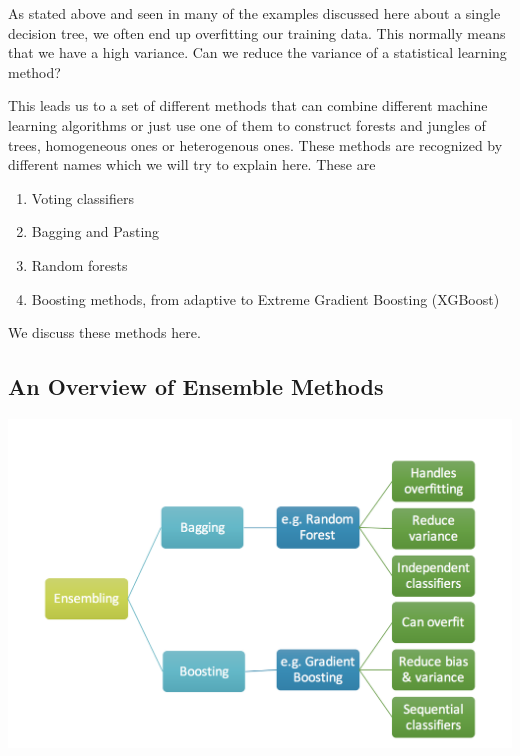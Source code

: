 \documentclass[%
oneside,                 %
final,                   %
10pt]{article}
\begin{document}
As stated above and seen in many of the examples discussed here about
a single decision tree, we often end up overfitting our training
data. This normally means that we have a high variance. Can we reduce
the variance of a statistical learning method?

This leads us to a set of different methods that can combine different
machine learning algorithms or just use one of them to construct forests and jungles of trees, homogeneous ones or heterogenous ones. These methods are recognized by different names which we will try to explain here. These are
\begin{enumerate}
\item Voting classifiers

\item Bagging and Pasting

\item Random forests

\item Boosting methods, from adaptive to Extreme Gradient Boosting (XGBoost)
\end{enumerate}

\noindent
We discuss these methods here.


\subsection{An Overview of Ensemble Methods}



\vspace{6mm}

\centerline{\includegraphics[width=0.8\linewidth]{DataFiles/ensembleoverview.png}}

\vspace{6mm}
\end{document}

